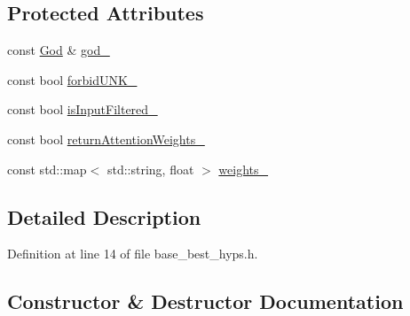\subsection*{Protected Attributes}
\begin{DoxyCompactItemize}
\item 
const \hyperlink{classamunmt_1_1God}{God} \& \hyperlink{classamunmt_1_1BestHypsBase_ab61b0c276c75cdb08dfb054893084ccd}{god\+\_\+}
\item 
const bool \hyperlink{classamunmt_1_1BestHypsBase_a9592ecfcb2ccd15751b8694525412648}{forbid\+U\+N\+K\+\_\+}
\item 
const bool \hyperlink{classamunmt_1_1BestHypsBase_a6906a24bd40784c66ba1772a314b826e}{is\+Input\+Filtered\+\_\+}
\item 
const bool \hyperlink{classamunmt_1_1BestHypsBase_a5c7d967963222a1a8cd64950830da217}{return\+Attention\+Weights\+\_\+}
\item 
const std\+::map$<$ std\+::string, float $>$ \hyperlink{classamunmt_1_1BestHypsBase_aea7067ab791aa3e86dbc925e7b8eca9b}{weights\+\_\+}
\end{DoxyCompactItemize}


\subsection{Detailed Description}


Definition at line 14 of file base\+\_\+best\+\_\+hyps.\+h.



\subsection{Constructor \& Destructor Documentation}
